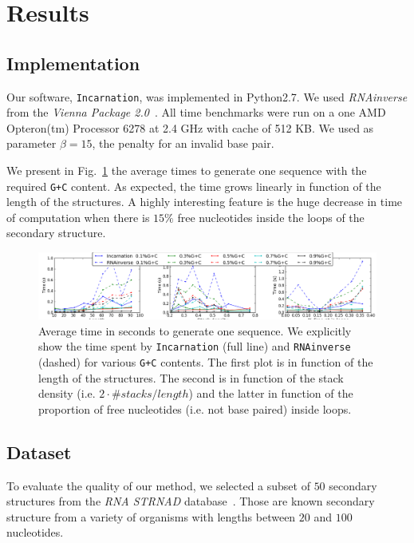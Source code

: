 \section{Results}
\label{sec:results}

\subsection{Implementation}
\label{sec:implementation}
Our software, \texttt{Incarnation}, was implemented in Python2.7. We used
\emph{RNAinverse} from the \textit{Vienna Package 2.0}~\cite{Hofacker:1994}.
All time benchmarks were run on a one AMD Opteron(tm) Processor 6278  at 2.4 GHz with cache of 512 KB.
 We used as parameter $\beta=15$, the penalty for an invalid base pair.



We present in Fig.~\ref{fig:time} the average times to generate one sequence
with the required \texttt{G+C} content. As expected, the time grows linearly
in function of the length of the structures.  A highly interesting feature
is the huge decrease in time of computation when there is $15\%$ free 
nucleotides inside the loops of the secondary structure.

\begin{figure}[ht!]
	\centering
	\includegraphics[scale=0.45]{Figures/time_rnastrand_clustered_rnainverse_100samples_fix}
	\caption{Average time in seconds to generate one sequence. We explicitly show 
	the time spent by \texttt{Incarnation} (full line) and \texttt{RNAinverse} (dashed) for various \texttt{G+C} contents. The first plot is in function
	of the length of the structures. The second is in function of the stack
	density (i.e. $2\cdot\#stacks/length$) and the latter in function of 
	the proportion of free nucleotides (i.e. not base paired) inside loops.}
	\label{fig:time}	
\end{figure}



\subsection{Dataset}
To evaluate the quality of our method, we selected a subset of $50$ secondary
structures from the \textit{RNA STRNAD} database~\cite{andronescu2008rna}.
Those are known secondary structure from a variety of organisms with 
 lengths between $20$ and $100$ nucleotides. 
 
